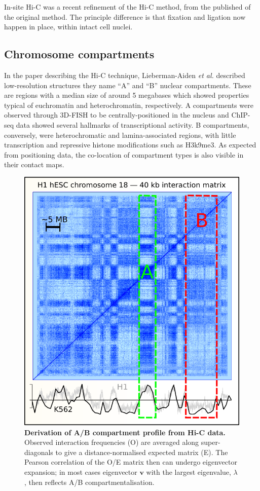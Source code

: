 \documentclass[a4paper,10pt,oneside]{book}
\begin{document}
In-site Hi-C was a recent refinement of the Hi-C method, from the published of the original method.\cite{Rao2014} The principle difference is that fixation and ligation now happen in place, within intact cell nuclei.

\subsection{Chromosome compartments}

In the paper describing the Hi-C technique,\cite{Lieberman2009}  Lieberman-Aiden \emph{et
  al.} described low-resolution structures they name  ``A'' and ``B'' nuclear compartments. These are regions with a median size of around 5 megabases which showed properties typical
of euchromatin and heterochromatin, respectively. A compartments were observed through 3D-FISH to be centrally-positioned in the nucleus and  ChIP-seq data showed several hallmarks of transcriptional activity. B compartments, conversely, were heterochromatic and lamina-associated regions, with little transcription and repressive histone modifications such as H3k9me3.\cite{Lieberman2009, DeWit2012} As expected from positioning data, the co-location of compartment types is also visible in their contact maps. \\

\begin{figure}
\begin{center}
\includegraphics[width=.75\textwidth]{figs/eigcalc.png}
\captionsetup{width=\textwidth}
\caption{ {\bf Derivation of A/B compartment profile from Hi-C data.} 
Observed interaction frequencies (O) are averaged along super-diagonals to give a distance-normalised expected matrix (E). The Pearson correlation of the O/E matrix then can undergo eigenvector expansion; in most cases eigenvector $\mathbf{v}$ with the largest eigenvalue, $\lambda$, then reflects A/B compartmentalisation.\cite{Lieberman2009}
}\label{fig:eigcalc}
\end{center}
\end{figure} 
\end{document}
